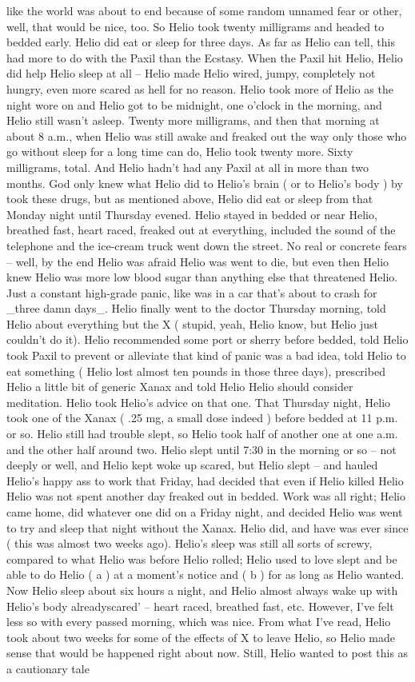 \documentclass[12pt]{book}
\begin{document}
like the world was about to end because of some random unnamed fear or other, well, that would be nice, too. So Helio took twenty milligrams and headed to bedded early. Helio did eat or sleep for three days. As far as Helio can tell, this had more to do with the Paxil than the Ecstasy. When the Paxil hit Helio, Helio did help Helio sleep at all -- Helio made Helio wired, jumpy, completely not hungry, even more scared as hell for no reason. Helio took more of Helio as the night wore on and Helio got to be midnight, one o'clock in the morning, and Helio still wasn't asleep. Twenty more milligrams, and then that morning at about 8 a.m., when Helio was still awake and freaked out the way only those who go without sleep for a long time can do, Helio took twenty more. Sixty milligrams, total. And Helio hadn't had any Paxil at all in more than two months. God only knew what Helio did to Helio's brain ( or to Helio's body ) by took these drugs, but as mentioned above, Helio did eat or sleep from that Monday night until Thursday evened. Helio stayed in bedded or near Helio, breathed fast, heart raced, freaked out at everything, included the sound of the telephone and the ice-cream truck went down the street. No real or concrete fears -- well, by the end Helio was afraid Helio was went to die, but even then Helio knew Helio was more low blood sugar than anything else that threatened Helio. Just a constant high-grade panic, like was in a car that's about to crash for \_three damn days\_. Helio finally went to the doctor Thursday morning, told Helio about everything but the X ( stupid, yeah, Helio know, but Helio just couldn't do it). Helio recommended some port or sherry before bedded, told Helio took Paxil to prevent or alleviate that kind of panic was a bad idea, told Helio to eat something ( Helio lost almost ten pounds in those three days), prescribed Helio a little bit of generic Xanax and told Helio Helio should consider meditation. Helio took Helio's advice on that one. That Thursday night, Helio took one of the Xanax ( .25 mg, a small dose indeed ) before bedded at 11 p.m. or so. Helio still had trouble slept, so Helio took half of another one at one a.m. and the other half around two. Helio slept until 7:30 in the morning or so -- not deeply or well, and Helio kept woke up scared, but Helio slept -- and hauled Helio's happy ass to work that Friday, had decided that even if Helio killed Helio Helio was not spent another day freaked out in bedded. Work was all right; Helio came home, did whatever one did on a Friday night, and decided Helio was went to try and sleep that night without the Xanax. Helio did, and have was ever since ( this was almost two weeks ago). Helio's sleep was still all sorts of screwy, compared to what Helio was before Helio rolled; Helio used to love slept and be able to do Helio ( a ) at a moment's notice and ( b ) for as long as Helio wanted. Now Helio sleep about six hours a night, and Helio almost always wake up with Helio's body alreadyscared' -- heart raced, breathed fast, etc. However, I've felt less so with every passed morning, which was nice. From what I've read, Helio took about two weeks for some of the effects of X to leave Helio, so Helio made sense that would be happened right about now. Still, Helio wanted to post this as a cautionary tale 
\end{document}
